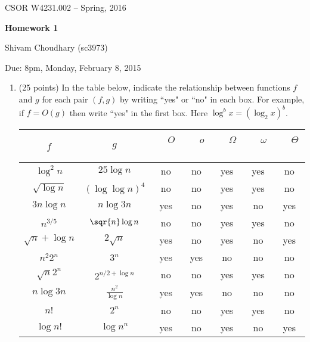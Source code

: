 \documentclass[11pt]{article}
\begin{document}
\begin{flushleft}
CSOR W4231.002 -- Spring, 2016
\end{flushleft}


 \centerline{\bf Homework 1}
\medskip
\centerline{Shivam Choudhary (sc3973)}
\centerline{Due: 8pm, Monday, February 8, 2015}

\medskip 

\bigskip



\begin{enumerate}

\item(25 points) In the table below, indicate the relationship between functions $f$ and $g$ 
for each pair $(f, g)$  by writing  ``yes" or ``no"  in each box. For example, 
if $f=O(g)$ then write ``yes"  in the first box. Here $\log^b{x} = (\log_2{x})^b$.


\begin{table}[tbh] \begin{center}
\begin{tabular}{|c|c|c|c|c|c|c|}\hline  %
$f$ & $g$ & \ \ $O$ \ \  & \ \  $o$ \ \   &  \ \ $\Omega$ \ \  &  \ \ $\omega$ \ \ & \ \ $\Theta$  \ \ \\ \hline
$\log^2{n}$ & $25\log{n}$  &no  &no  &yes    & yes & no \\ \hline
$\sqrt{ \log{n} }$ & $(\log{ \log{n}})^4$  & no  &no  &yes    &  yes&no \\ \hline
$3n \log{n}$ & $n\log{3n}$  &  yes &no  &yes    &no  &yes \\ \hline
$n^{3/5}$ & $\sqr{n}\log{n}$  & no  &no  &  yes   &yes  &no \\ \hline
$\sqrt{n} + \log{n}$ & $2\sqrt{n}$  & yes  &no   &   yes    & no&    yes \\ \hline
$n^2 2^n$ & $3^n$  &yes  &yes  &  no  &no  &no \\ \hline
$\sqrt{n} 2^n$ & $2^{n/2+\log{n}}$  &no &no  &yes    &yes  &no \\ \hline
$n \log{3n}$ & $\frac{n^2}{\log{n} }$  &  yes &yes  &no    &no  &no \\ \hline
$n!$ & $2^n$  &no  &no &yes    &yes  &no \\ \hline
$\log{n!}$ & $\log{n^n}$  & yes  &no  & yes   &no  &yes \\ \hline
\end{tabular}
\end{center}
\end{table} 


\end{enumerate}
\end{document}
